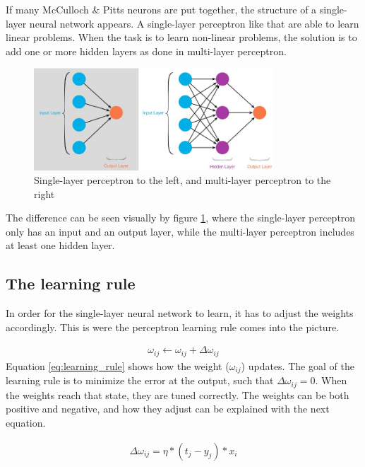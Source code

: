 \documentclass[USenglish]{ifimaster}  %
\begin{document}
If many McCulloch \& Pitts neurons are put together, the structure of a single-layer neural network appears. A single-layer perceptron like that are able to learn linear problems. When the task is to learn non-linear problems, the solution is to add one or more hidden layers as done in multi-layer perceptron.   
\begin{figure}[ht]
    \centering
    \includegraphics[width=0.8\textwidth]{bilder/slp_&_mlp.jpeg}
    \caption{Single-layer perceptron to the left, and multi-layer perceptron to the right \cite{website:slp_mlp}}
    \label{fig:slp_mlp}
\end{figure}
The difference can be seen visually by figure \ref{fig:slp_mlp}, where the single-layer perceptron only has an input and an output layer, while the multi-layer perceptron includes at least one hidden layer.
\newline
\newline
\subsection{The learning rule}
In order for the single-layer neural network to learn, it has to adjust the weights accordingly. This is were the perceptron learning rule comes into the picture.

\begin{equation}\label{eq:learning_rule}
\begin{aligned}
\omega_{ij} \longleftarrow \omega_{ij} + \Delta\omega_{ij}
\end{aligned}
\end{equation}
Equation \ref{eq:learning_rule} shows how the weight ($\omega_{ij}$) updates. The goal of the learning rule is to minimize the error at the output, such that $\Delta\omega_{ij} = 0 $. When the weights reach that state, they are tuned correctly. The weights can be both positive and negative, and how they adjust can be explained with the next equation. 

\begin{equation}\label{eq:delta_learning_rule}
\begin{aligned}
\Delta\omega_{ij} = \eta * (t_j - y_j) * x_i 
\end{aligned}
\end{equation}
\end{document}
